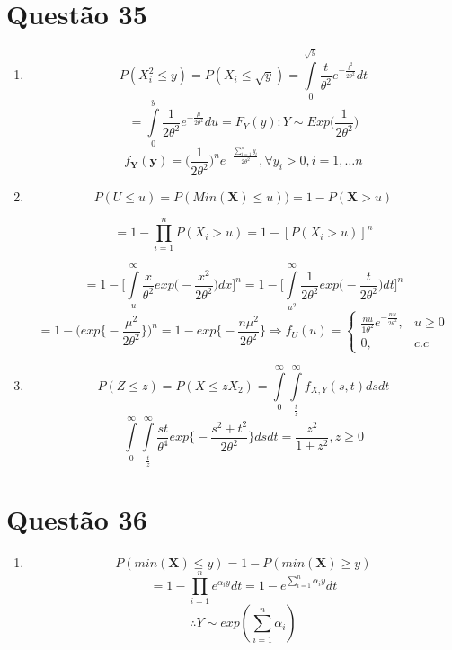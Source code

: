 \documentclass[a4paper,12pt]{report}
\begin{document}
					\section{Questão 35}
					 \begin{enumerate}[label=\alph*)]
					 	\item 
					 	
					 	$$P(X_i^2\le y) = 
					 	P(X_i \le \sqrt y)
					 =
					 \int\limits_0^{\sqrt y} \frac{t}{\theta^2} e^{-\frac{t^2}{2\theta^2}} dt 
					 	 $$
					 	 $$=  
					 	 \int\limits_0^{ y} \frac{1}{2\theta^2} e^{-\frac{\mu}{2\theta^2}} du = F_Y(y):Y\sim Exp\bigg(\frac{1}{2\theta^2}\bigg)
					 	 $$
					 	 $$f_{\bm Y }(\bm y) =\bigg(\frac{1}{2\theta^2}\bigg)^n e^{-\frac{\sum\limits_{i=1}^{n}y_i}{2\theta^2}}, \forall y_i>0,i=1,\ldots n  $$
					 	 \item 
					 	 $$P(U\le u) = P(Min(\bm X)\le u)) = 1- P(\bm X > u) $$
					 	 
					 	 $$= 1-\prod\limits_{i=1}^{n}P(X_i > u) = 1-[P(X_i > u)]^n $$
					 	 
					 	 $$= 1-\bigg[\int\limits_u^\infty \frac{x}{\theta^2} exp\bigg(-\frac{x^2}{2\theta^2}\bigg)dx \bigg]^n
					 	 = 1-\bigg[\int\limits_{u^2}^\infty \frac{1}{2\theta^2} exp\bigg(-\frac{t}{2\theta^2}\bigg)dt \bigg]^n
					 	  $$
					 	  $$
					 	  = 1 - \bigg(exp\bigg\{-\frac{\mu^2}{2\theta^2}\bigg\}\bigg)^n = 1 - exp\bigg\{-\frac{n\mu^2}{2\theta^2}\bigg\}
					 	  \Rightarrow f_U(u) = \begin{cases}
					 	  \frac{nu}{1\theta^2} e^{-\frac{nu}{2\theta^2}}, &u \ge 0\\
					 	  0, &c.c
					 	  \end{cases}
					 	  $$
					 	  \item $$P(Z\le z) = P(X\le zX_2) = \int\limits_0^\infty \int\limits_\frac{t}{z}^\infty f_{X,Y}(s,t)dsdt $$
					 	  $$ \int\limits_0^\infty \int\limits_\frac{t}{z}^\infty \frac{st}{\theta^4} exp\bigg\{
					 	  -\frac{s^2+t^2}{2\theta^2}
					 	  \bigg\} dsdt  
					 	  = \frac{z^2}{1+z^2}, z\ge 0
					 	  $$
					 \end{enumerate}
					\section{Questão 36}
					\begin{enumerate}[label=\alph*)]
						\item 
						$$P(min(\bm X)\le y) = 1-P(min (\bm X)\ge y) $$
						$$= 1- \prod\limits_{i=1}^{n}e^{\alpha_i y}dt =1 - e^{\sum\limits_{i=1}^{n}\alpha_i y}dt$$
						$$\therefore Y\sim exp(\sum\limits_{i=1}^{n} \alpha_i) $$
					\end{enumerate}
					
\end{document}
